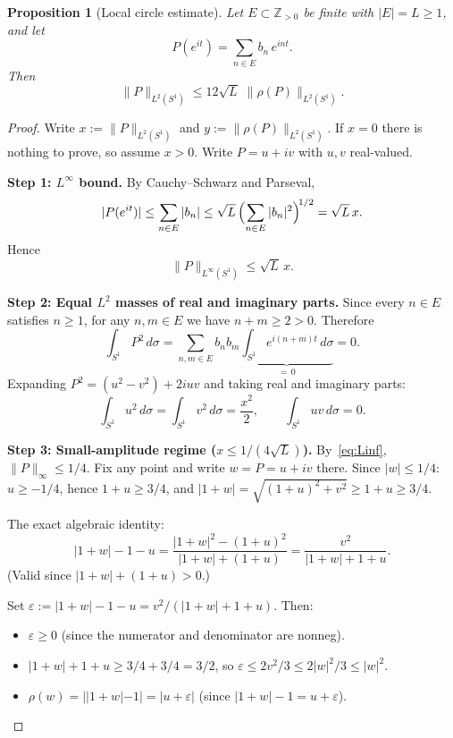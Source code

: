 \documentclass[11pt]{article}
\newtheorem{proposition}[theorem]{Proposition}
\newcommand{\rhof}{\rho}
\newcommand{\Zpos}{\mathbb{Z}_{>0}}
\newcommand{\norm}[1]{\lVert #1\rVert}
\begin{document}
\begin{proposition}[Local circle estimate]\label{prop:local}
Let $E \subset \Zpos$ be finite with $|E| = L \ge 1$, and let
\[
  P(e^{it}) = \sum_{n\in E} b_n\,e^{int}.
\]
Then
\begin{equation}\label{eq:local-bound}
  \norm{P}_{L^2(S^1)} \le 12\sqrt{L}\;\norm{\rhof(P)}_{L^2(S^1)}.
\end{equation}
\end{proposition}

\begin{proof}
Write $x := \norm{P}_{L^2(S^1)}$ and $y := \norm{\rhof(P)}_{L^2(S^1)}$.
If $x = 0$ there is nothing to prove, so assume $x > 0$.
Write $P = u + iv$ with $u,v$ real-valued.

\medskip\noindent\textbf{Step 1: $L^\infty$ bound.}
By Cauchy--Schwarz and Parseval,
\[
  |P(e^{it})| \le \sum_{n\in E}|b_n|
  \le \sqrt{L}\,\Bigl(\sum_{n\in E}|b_n|^2\Bigr)^{\!1/2}
  = \sqrt{L}\,x.
\]
Hence
\begin{equation}\label{eq:Linf}
  \norm{P}_{L^\infty(S^1)} \le \sqrt{L}\,x.
\end{equation}

\medskip\noindent\textbf{Step 2: Equal $L^2$ masses of real and imaginary parts.}
Since every $n \in E$ satisfies $n \ge 1$, for any $n,m \in E$ we have $n+m \ge 2 > 0$.
Therefore
\[
  \int_{S^1} P^2\,d\sigma
  = \sum_{n,m\in E} b_n b_m \underbrace{\int_{S^1} e^{i(n+m)t}\,d\sigma}_{=\,0}
  = 0.
\]
Expanding $P^2 = (u^2-v^2) + 2iuv$ and taking real and imaginary parts:
\begin{equation}\label{eq:equal-mass}
  \int_{S^1} u^2\,d\sigma = \int_{S^1} v^2\,d\sigma = \frac{x^2}{2},
  \qquad
  \int_{S^1} uv\,d\sigma = 0.
\end{equation}

\medskip\noindent\textbf{Step 3: Small-amplitude regime ($x \le 1/(4\sqrt{L})$).}
By~\eqref{eq:Linf}, $\norm{P}_\infty \le 1/4$.
Fix any point and write $w = P = u+iv$ there.
Since $|w| \le 1/4$: $u \ge -1/4$, hence $1+u \ge 3/4$, and
$|1+w| = \sqrt{(1+u)^2+v^2} \ge 1+u \ge 3/4$.

The exact algebraic identity:
\begin{equation}\label{eq:exact-id}
  |1+w|-1-u
  = \frac{|1+w|^2-(1+u)^2}{|1+w|+(1+u)}
  = \frac{v^2}{|1+w|+1+u}.
\end{equation}
(Valid since $|1+w|+(1+u) > 0$.)

Set $\varepsilon := |1+w|-1-u = v^2/(|1+w|+1+u)$.
Then:
\begin{itemize}[nosep]
\item $\varepsilon \ge 0$ (since the numerator and denominator are nonneg).
\item $|1+w|+1+u \ge 3/4+3/4 = 3/2$, so
  $\varepsilon \le 2v^2/3 \le 2|w|^2/3 \le |w|^2$.
\item $\rhof(w) = ||1+w|-1| = |u+\varepsilon|$
  (since $|1+w|-1 = u+\varepsilon$).
\end{itemize}


\end{proof}
\end{document}
